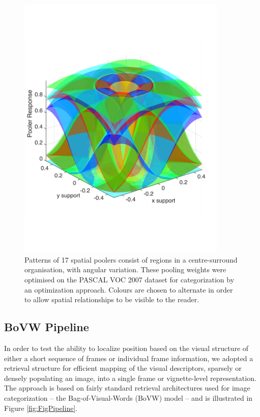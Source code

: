 
\begin{figure}[!h]
\begin{center}
\includegraphics[width=10cm,trim=0cm 3cm 0cm 3cm,clip=true]{gfx/Chapter06/PoolerResponses.pdf}
\caption{\label{fig:PoolerResponses}Patterns of 17 spatial poolers consist of regions in a centre-surround organisation, with angular variation.  These pooling weights were optimised on the PASCAL VOC 2007 dataset for categorization by an optimization approach. Colours are chosen to alternate in order to allow spatial relationships to be visible to the reader.}
\end{center}
\end{figure}

\subsection{BoVW Pipeline}
In order to test the ability to localize position based on the visual structure of either a short sequence of frames or individual frame information, we adopted a retrieval structure for efficient mapping of the visual descriptors, sparsely or densely populating an image,  into a single frame or vignette-level representation.  The approach is based on fairly standard retrieval architectures used for image categorization -- the Bag-of-Visual-Words (BoVW) model -- and is illustrated in Figure \ref{fig:FigPipeline}.

